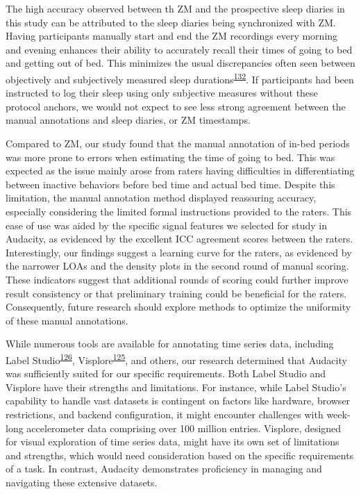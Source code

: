 \documentclass[
  10pt,
]{scrbook}
\begin{document}
The high accuracy observed between th ZM and the prospective sleep
diaries in this study can be attributed to the sleep diaries being
synchronized with ZM. Having participants manually start and end the ZM
recordings every morning and evening enhances their ability to
accurately recall their times of going to bed and getting out of bed.
This minimizes the usual discrepancies often seen between objectively
and subjectively measured sleep
durations\textsuperscript{\protect\hyperlink{ref-aili_reliability_2017}{132}}.
If participants had been instructed to log their sleep using only
subjective measures without these protocol anchors, we would not expect
to see less strong agreement between the manual annotations and sleep
diaries, or ZM timestamps.

Compared to ZM, our study found that the manual annotation of in-bed
periods was more prone to errors when estimating the time of going to
bed. This was expected as the issue mainly arose from raters having
difficulties in differentiating between inactive behaviors before bed
time and actual bed time. Despite this limitation, the manual annotation
method displayed reassuring accuracy, especially considering the limited
formal instructions provided to the raters. This ease of use was aided
by the specific signal features we selected for study in Audacity, as
evidenced by the excellent ICC agreement scores between the raters.
Interestingly, our findings suggest a learning curve for the raters, as
evidenced by the narrower LOAs and the density plots in the second round
of manual scoring. These indicators suggest that additional rounds of
scoring could further improve result consistency or that preliminary
training could be beneficial for the raters. Consequently, future
research should explore methods to optimize the uniformity of these
manual annotations.

While numerous tools are available for annotating time series data,
including Label
Studio\textsuperscript{\protect\hyperlink{ref-label_studio}{126}},
Visplore\textsuperscript{\protect\hyperlink{ref-visplore}{125}}, and
others, our research determined that Audacity was sufficiently suited
for our specific requirements. Both Label Studio and Visplore have their
strengths and limitations. For instance, while Label Studio's capability
to handle vast datasets is contingent on factors like hardware, browser
restrictions, and backend configuration, it might encounter challenges
with week-long accelerometer data comprising over 100 million entries.
Visplore, designed for visual exploration of time series data, might
have its own set of limitations and strengths, which would need
consideration based on the specific requirements of a task. In contrast,
Audacity demonstrates proficiency in managing and navigating these
extensive datasets.
\end{document}
